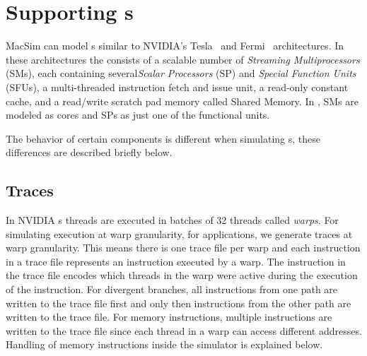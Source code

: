 \chapter{Supporting {\gpu}s}

MacSim can model {\gpu}s similar to NVIDIA's Tesla~\cite{lin:nic08} and
Fermi~\cite{fermi} architectures.  In these architectures the {\gpu} consists of a
scalable number of {\em Streaming Multiprocessors} (SMs), each containing
several{\em Scalar Processors} (SP) and {\em Special Function Units} (SFUs), a
multi-threaded instruction fetch and issue unit, a read-only constant cache, and
a read/write scratch pad memory called Shared Memory.  In \SIM, SMs are modeled
as cores and SPs as just one of the functional units. 



The behavior of certain components is different when simulating {\gpu}s, these
differences are described briefly below.

\section{Traces}
\label{sec:ptx_traces}

In NVIDIA {\gpu}s threads are executed in batches of 32 threads called
\textit{warps}. For simulating execution at warp granularity, for {\gpu}
applications, we generate traces at warp granularity. This means there
is one trace file per warp and each instruction in a trace file represents an
instruction executed by a warp. The instruction in the trace file encodes which
threads in the warp were active during the execution of the instruction. For
divergent branches, all instructions from one path are written to the trace
file first and only then instructions from the other path are written to the
trace file. For memory instructions, multiple instructions are written to the
trace file since each thread in a warp can access different addresses. Handling
of memory instructions inside the simulator is explained below.


